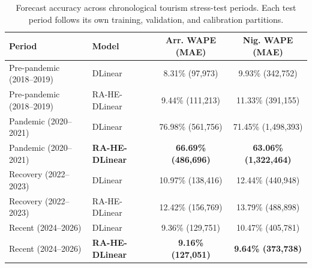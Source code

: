 \begin{table}[!t]
\centering
\caption{Forecast accuracy across chronological tourism stress-test periods. Each test period follows its own training, validation, and calibration partitions.}
\label{tab:reviewer_regimes}
\scriptsize
\setlength{\tabcolsep}{2.5pt}
\renewcommand{\arraystretch}{0.92}
\begin{tabular}{@{}llcc@{}}
\toprule
\textbf{Period} & \textbf{Model} & \textbf{Arr. WAPE (MAE)} & \textbf{Nig. WAPE (MAE)} \\
\midrule
Pre-pandemic (2018--2019) & DLinear & 8.31\% (97,973) & 9.93\% (342,752) \\
Pre-pandemic (2018--2019) & RA-HE-DLinear & 9.44\% (111,213) & 11.33\% (391,155) \\
Pandemic (2020--2021) & DLinear & 76.98\% (561,756) & 71.45\% (1,498,393) \\
Pandemic (2020--2021) & \textbf{RA-HE-DLinear} & \textbf{66.69\% (486,696)} & \textbf{63.06\% (1,322,464)} \\
Recovery (2022--2023) & DLinear & 10.97\% (138,416) & 12.44\% (440,948) \\
Recovery (2022--2023) & RA-HE-DLinear & 12.42\% (156,769) & 13.79\% (488,898) \\
Recent (2024--2026) & DLinear & 9.36\% (129,751) & 10.47\% (405,781) \\
Recent (2024--2026) & \textbf{RA-HE-DLinear} & \textbf{9.16\% (127,051)} & \textbf{9.64\% (373,738)} \\
\bottomrule
\end{tabular}
\end{table}
